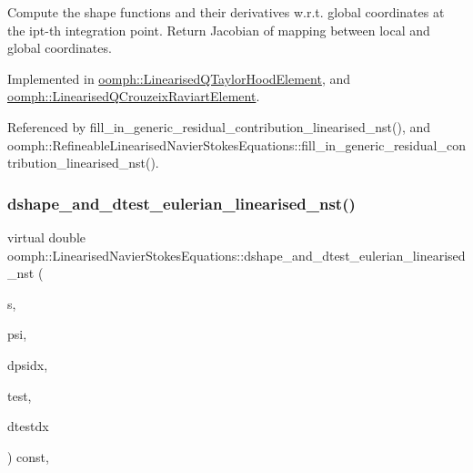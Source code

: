 Compute the shape functions and their derivatives w.\+r.\+t. global coordinates at the ipt-\/th integration point. Return Jacobian of mapping between local and global coordinates. 



Implemented in \hyperlink{classoomph_1_1LinearisedQTaylorHoodElement_a03f34e02301c483325c4d77ed714ad56}{oomph\+::\+Linearised\+Q\+Taylor\+Hood\+Element}, and \hyperlink{classoomph_1_1LinearisedQCrouzeixRaviartElement_ae3b60d3e296e3a17d3e1ef48356f8dc3}{oomph\+::\+Linearised\+Q\+Crouzeix\+Raviart\+Element}.



Referenced by fill\+\_\+in\+\_\+generic\+\_\+residual\+\_\+contribution\+\_\+linearised\+\_\+nst(), and oomph\+::\+Refineable\+Linearised\+Navier\+Stokes\+Equations\+::fill\+\_\+in\+\_\+generic\+\_\+residual\+\_\+contribution\+\_\+linearised\+\_\+nst().

\mbox{\label{classoomph_1_1LinearisedNavierStokesEquations_afb0b66566d03c7f9d8129614297e63ed}} 
\subsubsection{\texorpdfstring{dshape\+\_\+and\+\_\+dtest\+\_\+eulerian\+\_\+linearised\+\_\+nst()}{dshape\_and\_dtest\_eulerian\_linearised\_nst()}}
{\footnotesize\ttfamily virtual double oomph\+::\+Linearised\+Navier\+Stokes\+Equations\+::dshape\+\_\+and\+\_\+dtest\+\_\+eulerian\+\_\+linearised\+\_\+nst (\begin{DoxyParamCaption}\item[{const \hyperlink{classoomph_1_1Vector}{Vector}$<$ double $>$ \&}]{s,  }\item[{\hyperlink{classoomph_1_1Shape}{Shape} \&}]{psi,  }\item[{\hyperlink{classoomph_1_1DShape}{D\+Shape} \&}]{dpsidx,  }\item[{\hyperlink{classoomph_1_1Shape}{Shape} \&}]{test,  }\item[{\hyperlink{classoomph_1_1DShape}{D\+Shape} \&}]{dtestdx }\end{DoxyParamCaption}) const\hspace{0.3cm}{\ttfamily [protected]}, {}}



